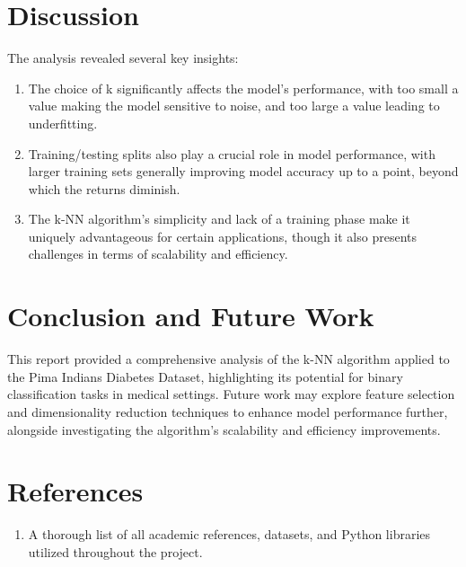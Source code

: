 \documentclass[11pt, a4paper]{article}
\begin{document}
\section{Discussion}
The analysis revealed several key insights:
\begin{enumerate}
    \item The choice of k significantly affects the model's performance, with too small a value making the model sensitive to noise, and too large a value leading to underfitting.
    \item Training/testing splits also play a crucial role in model performance, with larger training sets generally improving model accuracy up to a point, beyond which the returns diminish.
    \item The k-NN algorithm's simplicity and lack of a training phase make it uniquely advantageous for certain applications, though it also presents challenges in terms of scalability and efficiency.
\end{enumerate}

\section{Conclusion and Future Work}
This report provided a comprehensive analysis of the k-NN algorithm applied to the Pima Indians Diabetes Dataset, highlighting its potential for binary classification tasks in medical settings. Future work may explore feature selection and dimensionality reduction techniques to enhance model performance further, alongside investigating the algorithm's scalability and efficiency improvements.

\section*{References}
\begin{enumerate}
    \item A thorough list of all academic references, datasets, and Python libraries utilized throughout the project.
\end{enumerate}
\end{document}
